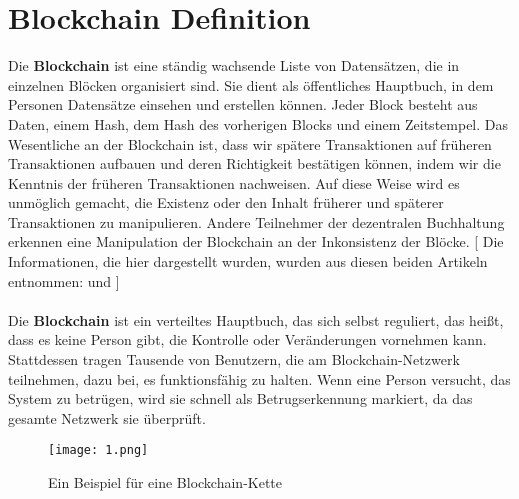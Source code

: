 \section{Blockchain Definition}\label{blockchain:definition}
Die \textbf{Blockchain} ist eine ständig wachsende Liste von Datensätzen, die in einzelnen Blöcken organisiert sind. Sie dient als öffentliches Hauptbuch, in dem Personen Datensätze einsehen und erstellen können. Jeder Block besteht aus Daten, einem Hash, dem Hash des vorherigen Blocks und einem Zeitstempel. Das Wesentliche an der Blockchain ist, dass wir spätere Transaktionen auf früheren Transaktionen aufbauen und deren Richtigkeit bestätigen können, indem wir die Kenntnis der früheren Transaktionen nachweisen. Auf diese Weise wird es unmöglich gemacht, die Existenz oder den Inhalt früherer und späterer Transaktionen zu manipulieren. Andere Teilnehmer der dezentralen Buchhaltung erkennen eine Manipulation der Blockchain an der Inkonsistenz der Blöcke. [ Die Informationen, die hier dargestellt wurden, wurden aus diesen beiden Artikeln entnommen: \cite{iotforall_2022} und \cite{businessinsider} ] \\ \\
Die \textbf{Blockchain} ist ein verteiltes Hauptbuch, das sich selbst reguliert, das heißt, dass es keine Person gibt, die Kontrolle oder Veränderungen vornehmen kann. Stattdessen tragen Tausende von Benutzern, die am Blockchain-Netzwerk teilnehmen, dazu bei, es funktionsfähig zu halten. Wenn eine Person versucht, das System zu betrügen, wird sie schnell als Betrugserkennung markiert, da das gesamte Netzwerk sie überprüft.

\begin{figure}[h!]
	\centering
	\texttt{[image: 1.png]}
	\caption{Ein Beispiel für eine Blockchain-Kette}
	\small \cite{first_image}
\end{figure} 


